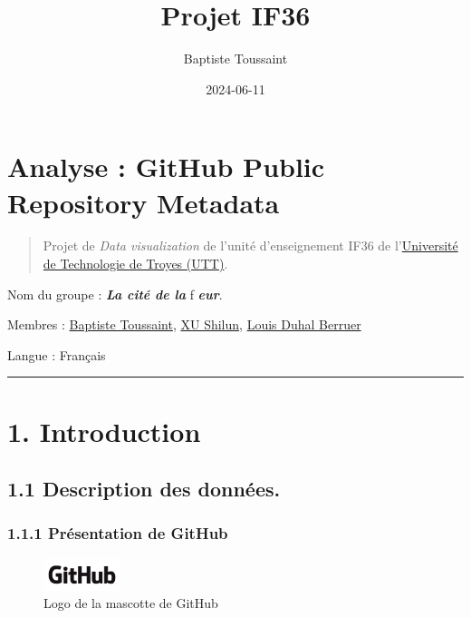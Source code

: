 \documentclass[
]{article}
\title{Projet IF36}
\author{Baptiste Toussaint}
\date{2024-06-11}
\begin{document}
\maketitle

\section{Analyse : GitHub Public Repository
Metadata}\label{analyse-github-public-repository-metadata}

\begin{quote}
Projet de \emph{Data visualization} de l'unité d'enseignement IF36 de
l'\href{https://www.utt.fr/}{Université de Technologie de Troyes (UTT)}.
\end{quote}

Nom du groupe : \textbf{\emph{La cité de la}} f \textbf{\emph{eur}}.

Membres : \href{https://github.com/I3at57}{Baptiste Toussaint},
\href{https://github.com/yvlann}{XU Shilun},
\href{https://github.com/louisduhalberruer}{Louis Duhal Berruer}

Langue : Français

\begin{center}\rule{0.5\linewidth}{0.5pt}\end{center}

\section{1. Introduction}\label{introduction}

\subsection{1.1 Description des
données.}\label{description-des-donnuxe9es.}

\subsubsection{1.1.1 Présentation de
GitHub}\label{pruxe9sentation-de-github}

\begin{figure}
\centering
\includegraphics[width=0.2\textwidth,height=0.2\textheight]{./src/img/GitHub_Logo.png}
\caption{Logo de la mascotte de GitHub}
\end{figure}
\end{document}
